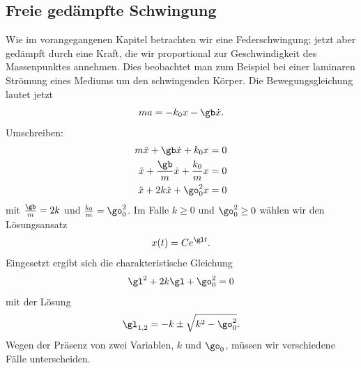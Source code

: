 \documentclass[%
11pt,%
twoside,%
titlepage,%
german,%
headsepline%
]{scrartcl}
\begin{document}
\subsection{Freie ged\"ampfte Schwingung}

Wie im vorangegangenen Kapitel betrachten wir eine Federschwingung; jetzt aber
ged\"ampft durch eine Kraft, die wir proportional zur Geschwindigkeit des Massenpunktes annehmen. Dies beobachtet man zum Beispiel bei einer laminaren Str\"omung eines Mediums um den schwingenden K\"orper. Die Bewegungsgleichung lautet jetzt
$$ma=-k_0x-\gb \dot{x}.$$
Umschreiben:
\begin{align*}
m\ddot{x}+\gb \dot{x}+k_0x &=0\\
\ddot{x} +\frac{\gb}{m}\dot{x}+\frac{k_0}{m}x&=0\\
\ddot{x}+2k\dot{x}+\go_0^2 x &=0
\end{align*}
mit $\frac{\gb}{m}=2k$ und $\frac{k_0}{m}=\go_0^2$.
Im Falle $k\geq0$ und $\go_0^2\geq0$ w\"ahlen wir den L\"osungsansatz
$$x(t)=Ce^{\gl t}.$$
Eingesetzt ergibt sich die charakteristische Gleichung
$$\gl^2+2k\gl+\go_0^2=0$$
mit der L\"osung
$$\gl_{1,2}=-k\pm\sqrt{k^2-\go_0^2}.$$
Wegen der Pr\"asenz von zwei Variablen, $k$ und $\go_0$, m\"ussen wir verschiedene F\"alle unterscheiden.
\end{document}

